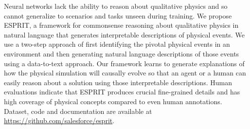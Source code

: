 Neural networks lack the ability to reason about qualitative physics and so cannot generalize to scenarios and tasks unseen during training. We propose ESPRIT, a framework for commonsense reasoning about qualitative physics in natural language that generates interpretable descriptions of physical events. We use a two-step approach of first identifying the pivotal physical events in an environment and then generating natural language descriptions of those events using a data-to-text approach. Our framework learns to generate explanations of how the physical simulation will causally evolve so that an agent or a human can easily reason about a solution using those interpretable descriptions. Human evaluations indicate that ESPRIT produces crucial fine-grained details and has high coverage of physical concepts compared to even human annotations. Dataset, code and documentation are available at \url{https://github.com/salesforce/esprit}.
